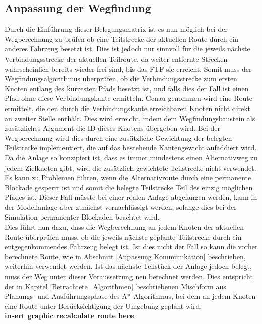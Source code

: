 	\subsection{Anpassung der Wegfindung}
		Durch die Einführung dieser Belegungsmatrix ist es nun möglich bei der Wegberechnung zu prüfen ob eine Teilstrecke der aktuellen Route durch ein anderes Fahrzeug besetzt ist. Dies ist jedoch nur sinnvoll für die jeweils nächste Verbindungsstrecke der aktuellen Teilroute, da weiter entfernte Strecken wahrscheinlich bereits wieder frei sind, bis das \ac{FTF} sie erreicht. Somit muss der Wegfindungsalgorithmus überprüfen, ob die Verbindungsstrecke zum ersten Knoten entlang des kürzesten Pfads besetzt ist, und falls dies der Fall ist einen Pfad ohne diese Verbindungskante ermitteln. Genau genommen wird eine Route ermittelt, die den durch die Verbindungskante erreichbaren Knoten nicht direkt an zweiter Stelle enthält.	Dies wird erreicht, indem dem Wegfindungsbaustein als zusätzliches Argument die ID dieses Knotens übergeben wird. Bei der Wegberechnung wird dies durch eine zusätzliche Gewichtung der belegten Teilstrecke implementiert, die auf das bestehende Kantengewicht aufaddiert wird. Da die Anlage so konzipiert ist, dass es immer mindestens einen Alternativweg zu jedem Zielknoten gibt, wird die zusätzlich gewichtete Teilstrecke nicht verwendet. Es kann zu Problemen führen, wenn die Alternativroute durch eine permanente Blockade gesperrt ist und somit die belegte Teilstrecke Teil des einzig möglichen Pfades ist. Dieser Fall müsste bei einer realen Anlage abgefangen werden, kann in der Modellanlage aber zunächst vernachlässigt werden, solange dies bei der Simulation permanenter Blockaden beachtet wird.
		\\[4pt]
		Dies führt nun dazu, dass die Wegberechnung an jedem Knoten der aktuellen Route überprüfen muss, ob die jeweils nächste geplante Teilstrecke durch ein entgegenkommendes Fahrzeug belegt ist. Ist dies nicht der Fall so kann die vorher berechnete Route, wie in Abschnitt \ref{Anpassung Kommunikation} beschrieben, weiterhin verwendet werden. Ist das nächste Teilstück der Anlage jedoch belegt, muss der Weg unter dieser Voraussetzung neu berechnet werden. Dies entspricht der in Kapitel \ref{Betrachtete_Algorithmen} beschriebenen Mischform aus Planungs- und Ausführungsphase des A*-Algorithmus, bei dem an jedem Knoten eine Route unter Berücksichtigung der Umgebung geplant wird.
		\\ \textbf{insert graphic recalculate route here}
	
